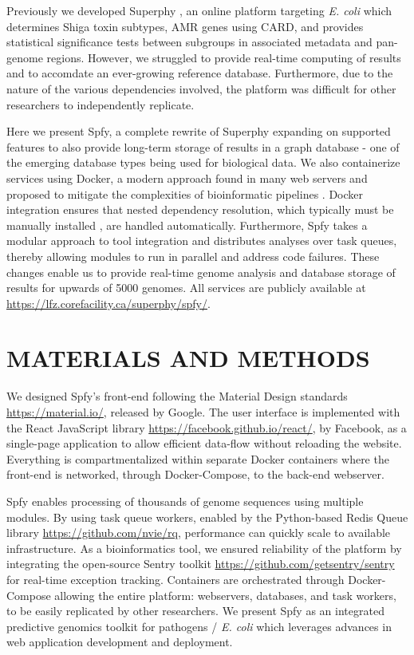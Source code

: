 \documentclass[a4,center,fleqn]{NAR}
\begin{document}
Previously we developed Superphy \cite{whiteside2016superphy}, an online platform targeting \textit{E. coli} which determines Shiga toxin subtypes, AMR genes using CARD, and provides statistical significance tests between subgroups in associated metadata and pan-genome regions.
However, we struggled to provide real-time computing of results and to accomdate an ever-growing reference database.
Furthermore, due to the nature of the various dependencies involved, the platform was difficult for other researchers to independently replicate.

Here we present Spfy, a complete rewrite of Superphy expanding on supported features to also provide long-term storage of results in a graph database - one of the emerging \cite{de2015trends} database types being used for biological data.
We also containerize services using Docker, a modern approach found in many web servers and proposed to mitigate the complexities of bioinformatic pipelines \cite{di2015impact}.
Docker integration ensures that nested dependency resolution, which typically must be manually installed \cite{doi:10.1093/bioinformatics/btu153,laing2010pan,inouye2014srst2}, are handled automatically.
Furthermore, Spfy takes a modular approach to tool integration and distributes analyses over task queues, thereby allowing modules to run in parallel and address code failures.
These changes enable us to provide real-time genome analysis and database storage of results for upwards of 5000 genomes.
All services are publicly available at \url{https://lfz.corefacility.ca/superphy/spfy/}.

\section{MATERIALS AND METHODS}
We designed Spfy's front-end following the Material Design standards \url{https://material.io/}, released by Google.
The user interface is implemented with the React JavaScript library \url{https://facebook.github.io/react/}, by Facebook, as a single-page application to allow efficient data-flow without reloading the website.
Everything is compartmentalized within separate Docker containers where the front-end is networked, through Docker-Compose, to the back-end webserver.

Spfy enables processing of thousands of genome sequences using multiple modules.
By using task queue workers, enabled by the Python-based Redis Queue library \url{https://github.com/nvie/rq}, performance can quickly scale to available infrastructure.
As a bioinformatics tool, we ensured reliability of the platform by integrating the open-source Sentry toolkit \url{https://github.com/getsentry/sentry} for real-time exception tracking.
Containers are orchestrated through Docker-Compose allowing the entire platform: webservers, databases, and task workers, to be easily replicated by other researchers.
We present Spfy as an integrated predictive genomics toolkit for pathogens / \textit{E. coli} which leverages advances in web application development and deployment.
\end{document}

